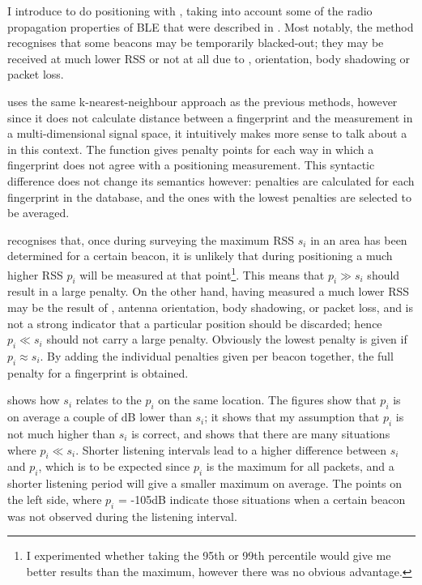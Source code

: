 I introduce \BRP to do positioning with \BLE, taking into account some of the radio propagation properties of BLE that were described in . 
Most notably, the method recognises that some beacons may be temporarily blacked-out; they may be received at much lower RSS or not at all due to \mpi, orientation, body shadowing or packet loss.

\aBRP uses the same k-nearest-neighbour approach as the previous methods, however since it does not calculate distance between a fingerprint and the measurement in a multi-dimensional signal space, it intuitively makes more sense to talk about a  in this context.
The function gives penalty points for each way in which a fingerprint does not agree with a positioning measurement.
This syntactic difference does not change its semantics however: penalties are calculated for each fingerprint in the database, and the ones with the lowest penalties are selected to be averaged.

\BRP recognises that, once during surveying the maximum RSS $s_i$ in an area has been determined for a certain beacon, it is unlikely that during positioning a much higher RSS $p_i$ will be measured at that point\footnote{I experimented whether taking the 95th or 99th percentile would give me better results than the maximum, however there was no obvious advantage.}.
This means that $p_i \gg s_i$ should result in a large penalty.
On the other hand, having measured a much lower RSS may be the result of \mpi, antenna orientation, body shadowing, or packet loss, and is not a strong indicator that a particular position should be discarded; hence $p_i \ll s_i$ should not carry a large penalty.
Obviously the lowest penalty is given if $p_i \approx s_i$.
By adding the individual penalties given per beacon together, the full penalty for a fingerprint is obtained.

 shows how $s_i$ relates to the $p_i$ on the same location.
The figures show that $p_i$ is on average a couple of dB lower than $s_i$; it shows that my assumption that $p_i$ is not much higher than $s_i$ is correct, and shows that there are many situations where $p_i \ll s_i$.
Shorter listening intervals lead to a higher difference between $s_i$ and $p_i$, which is to be expected since $p_i$ is the maximum for all packets, and a shorter listening period will give a smaller maximum on average.
The points on the left side, where $p_i$ = -105dB indicate those situations when a certain beacon was not observed during the listening interval.

